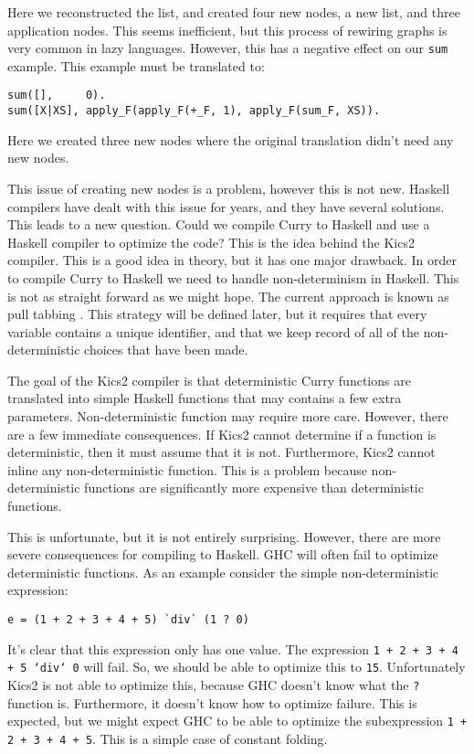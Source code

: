 Here we reconstructed the list, and created four new nodes, a new list, and three application nodes.
This seems inefficient, but this process of rewiring graphs is very common in lazy languages.
However, this has a negative effect on our \texttt{sum} example.
This example must be translated to:
\begin{verbatim}
sum([],     0).
sum([X|XS], apply_F(apply_F(+_F, 1), apply_F(sum_F, XS)).
\end{verbatim}
Here we created three new nodes where the original translation didn't need any new nodes.

This issue of creating new nodes is a problem, however this is not new.
Haskell compilers have dealt with this issue for years, and they have several solutions.
This leads to a new question.
Could we compile Curry to Haskell and use a Haskell compiler to optimize the code?
This is the idea behind the Kics2 compiler.
This is a good idea in theory, but it has one major drawback.
In order to compile Curry to Haskell we need to handle non-determinism in Haskell.
This is not as straight forward as we might hope.
The current approach is known as pull tabbing \cite{Antoy11ICLP}.
This strategy will be defined later, but it requires that every variable contains a unique identifier,
and that we keep record of all of the non-deterministic choices that have been made.

The goal of the Kics2 compiler is that deterministic Curry functions are translated into simple Haskell functions
that may contains a few extra parameters.
Non-deterministic function may require more care.
However, there are a few immediate consequences.
If Kics2 cannot determine if a function is deterministic, then it must assume that it is not.
Furthermore, Kics2 cannot inline any non-deterministic function.
This is a problem because non-deterministic functions are significantly more expensive than deterministic functions.

This is unfortunate, but it is not entirely surprising.
However, there are more severe consequences for compiling to Haskell.
GHC will often fail to optimize deterministic functions.
As an example consider the simple non-deterministic expression:
\begin{verbatim}
e = (1 + 2 + 3 + 4 + 5) `div` (1 ? 0)
\end{verbatim}
It's clear that this expression only has one value.  The expression \texttt{1 + 2 + 3 + 4 + 5 `div` 0} will fail.
So, we should be able to optimize this to \texttt{15}.
Unfortunately Kics2 is not able to optimize this, because GHC doesn't know what the \texttt ? function is.
Furthermore, it doesn't know how to optimize failure.
This is expected, but we might expect GHC to be able to optimize the subexpression \texttt{1 + 2 + 3 + 4 + 5}.
This is a simple case of constant folding.


